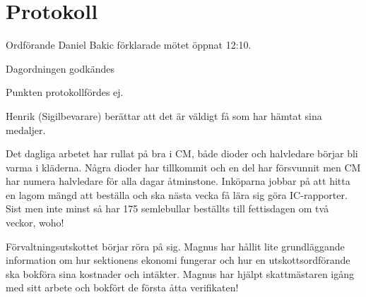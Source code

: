 \documentclass[10pt]{article}
\def\mo{Daniel Bakic}
\begin{document}
\section*{Protokoll}
\begin{paragrafer}
Ordförande {\mo} förklarade mötet öppnat 12:10.

{\valavmo}

{\valavms}

{\valavj}

{\tosg}

{\ingaadj}


Dagordningen godkändes



\begin{fyllnadsval} %
\end{fyllnadsval}

\begin{paragrafer}
Punkten protokollfördes ej.

Henrik (Sigilbevarare) berättar att det är väldigt få som har hämtat sina medaljer.

Det dagliga arbetet har rullat på bra i CM, både dioder och halvledare börjar bli varma i kläderna. Några dioder har tillkommit och en del har försvunnit men CM har numera halvledare för alla dagar åtminstone. Inköparna jobbar på att hitta en lagom mängd att beställa och ska nästa vecka få lära sig göra IC-rapporter. Sist men inte minst så har 175 semlebullar beställts till fettisdagen om två veckor, woho!

Förvaltningsutskottet börjar röra på sig. Magnus har hållit lite grundläggande information om hur sektionens ekonomi fungerar och hur en utskottsordförande ska bokföra sina kostnader och intäkter. Magnus har hjälpt skattmästaren igång med sitt arbete och bokfört de första åtta verifikaten!


\end{paragrafer}
\end{paragrafer}
\end{document}
